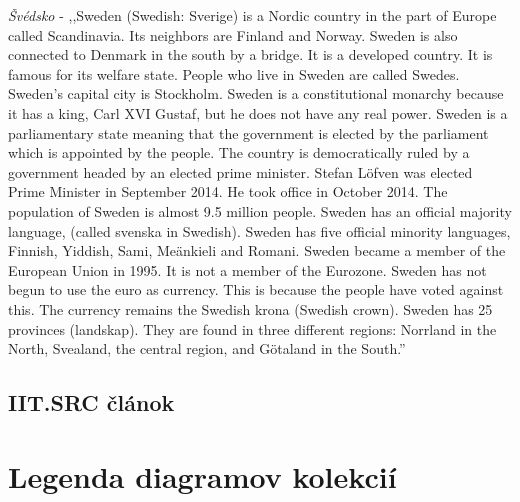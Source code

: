 \noindent
\textit{Švédsko} - ,,Sweden (Swedish: Sverige) is a Nordic country in the part of Europe called Scandinavia. Its neighbors are Finland and Norway. Sweden is also connected to Denmark in the south by a bridge. It is a developed country. It is famous for its welfare state. People who live in Sweden are called Swedes. Sweden's capital city is Stockholm. Sweden is a constitutional monarchy because it has a king, Carl XVI Gustaf, but he does not have any real power. Sweden is a parliamentary state meaning that the government is elected by the parliament which is appointed by the people. The country is democratically ruled by a government headed by an elected prime minister. Stefan Löfven was elected Prime Minister in September 2014. He took office in October 2014. The population of Sweden is almost 9.5 million people. Sweden has an official majority language, (called svenska in Swedish). Sweden has five official minority languages, Finnish, Yiddish, Sami, Meänkieli and Romani. Sweden became a member of the European Union in 1995. It is not a member of the Eurozone. Sweden has not begun to use the euro as currency. This is because the people have voted against this. The currency remains the Swedish krona (Swedish crown). Sweden has 25 provinces (landskap). They are found in three different regions: Norrland in the North, Svealand, the central region, and Götaland in the South.''

\newpage
{}
{
	\section{IIT.SRC článok}
}
{
	\chapter{Legenda diagramov kolekcií}
}

